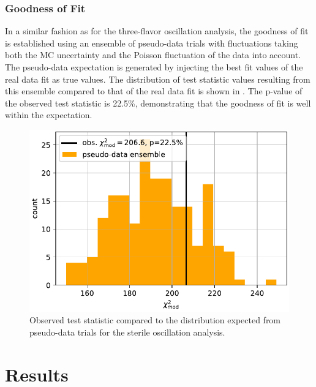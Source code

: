 \subsubsection{Goodness of Fit}
In a similar fashion as for the three-flavor oscillation analysis, the goodness of fit is established using an ensemble of pseudo-data trials with fluctuations taking both the MC uncertainty and the Poisson fluctuation of the data into account. The pseudo-data expectation is generated by injecting the best fit values of the real data fit as true values. The distribution of test statistic values resulting from this ensemble compared to that of the real data fit is shown in . The p-value of the observed test statistic is 22.5\%, demonstrating that the goodness of fit is well within the expectation.

\begin{figure}
    \centering
    \includegraphics[width=0.8\linewidth]{figures/measurement/sterile_analysis/results/compare_ts_to_ensemble_REAL_DATA_FIT_v12_ext_holeice.pdf}
    \caption{Observed test statistic compared to the distribution expected from pseudo-data trials for the sterile oscillation analysis.}
    \label{fig:sterile-modchi2-ensemble-comparison}
\end{figure}

\section{Results}

